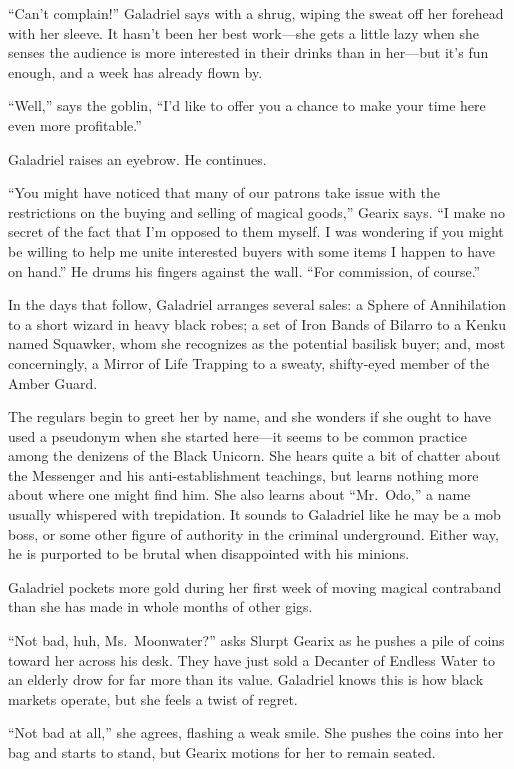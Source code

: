 \documentclass[smalldemyvopaper,11pt,twoside,onecolumn,openright,extrafontsizes]{memoir}
\begin{document}
``Can't complain!'' Galadriel says with a shrug, wiping the sweat off
her forehead with her sleeve. It hasn't been her best work---she gets a
little lazy when she senses the audience is more interested in their
drinks than in her---but it's fun enough, and a week has already flown
by.

``Well,'' says the goblin, ``I'd like to offer you a chance to make your
time here even more profitable.''

Galadriel raises an eyebrow. He continues.

``You might have noticed that many of our patrons take issue with the
restrictions on the buying and selling of magical goods,'' Gearix says.
``I make no secret of the fact that I'm opposed to them myself. I was
wondering if you might be willing to help me unite interested buyers
with some items I happen to have on hand.'' He drums his fingers against
the wall. ``For commission, of course.''

In the days that follow, Galadriel arranges several sales: a Sphere of
Annihilation to a short wizard in heavy black robes; a set of Iron Bands
of Bilarro to a Kenku named Squawker, whom she recognizes as the
potential basilisk buyer; and, most concerningly, a Mirror of Life
Trapping to a sweaty, shifty-eyed member of the Amber Guard.

The regulars begin to greet her by name, and she wonders if she ought to
have used a pseudonym when she started here---it seems to be common
practice among the denizens of the Black Unicorn. She hears quite a bit
of chatter about the Messenger and his anti-establishment teachings, but
learns nothing more about where one might find him. She also learns
about ``Mr.~Odo,'' a name usually whispered with trepidation. It sounds
to Galadriel like he may be a mob boss, or some other figure of
authority in the criminal underground. Either way, he is purported to be
brutal when disappointed with his minions.

Galadriel pockets more gold during her first week of moving magical
contraband than she has made in whole months of other gigs.

``Not bad, huh, Ms.~Moonwater?'' asks Slurpt Gearix as he pushes a pile
of coins toward her across his desk. They have just sold a Decanter of
Endless Water to an elderly drow for far more than its value. Galadriel
knows this is how black markets operate, but she feels a twist of
regret.

``Not bad at all,'' she agrees, flashing a weak smile. She pushes the
coins into her bag and starts to stand, but Gearix motions for her to
remain seated.
\end{document}
